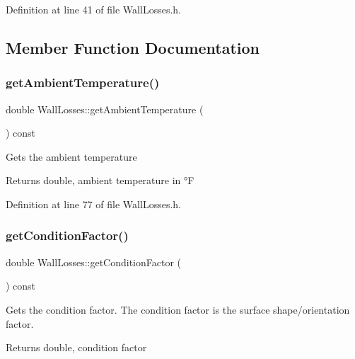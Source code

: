 Definition at line 41 of file Wall\+Losses.\+h.



\subsection{Member Function Documentation}
\mbox{\label{class_wall_losses_a806cb5860fe78d0379e3877f043655ad}} 
\subsubsection{\texorpdfstring{get\+Ambient\+Temperature()}{getAmbientTemperature()}}
{\footnotesize\ttfamily double Wall\+Losses\+::get\+Ambient\+Temperature (\begin{DoxyParamCaption}{ }\end{DoxyParamCaption}) const\hspace{0.3cm}{\ttfamily [inline]}}

Gets the ambient temperature \begin{DoxyReturn}{Returns}
double, ambient temperature in °F 
\end{DoxyReturn}


Definition at line 77 of file Wall\+Losses.\+h.

\mbox{\label{class_wall_losses_a16ab4003a17f9e95f28b9390b92c2b27}} 
\subsubsection{\texorpdfstring{get\+Condition\+Factor()}{getConditionFactor()}}
{\footnotesize\ttfamily double Wall\+Losses\+::get\+Condition\+Factor (\begin{DoxyParamCaption}{ }\end{DoxyParamCaption}) const\hspace{0.3cm}{\ttfamily [inline]}}

Gets the condition factor. The condition factor is the surface shape/orientation factor. \begin{DoxyReturn}{Returns}
double, condition factor 
\end{DoxyReturn}


